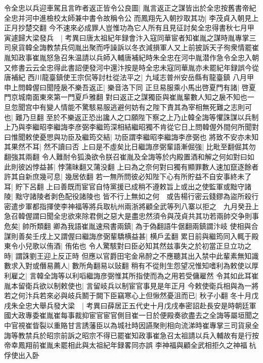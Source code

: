 令全忠以兵迎車駕且言昨者返正皆令公良圖|{
	胤言返正之謀皆出於全忠按舊書帝紀全忠并河中進檢校太師兼中書令故稱令公}
而鳳翔先入朝抄取其功|{
	李茂貞入朝見上正月抄楚交翻}
今不速來必成罪人豈惟功為它人所有且見征討矣全忠得書秋七月甲寅遽歸大梁發兵　|{
	考異曰唐太祖紀年録會汴入寇同華宦者知崔胤之謀時胤專掌三司泉貨韓全誨教禁兵伺胤出聚而呼譟訴以冬衣減損軍人又上前披訴天子徇衆情罷崔胤知政事崔胤怒急召朱温請以兵師入輔唐補紀時朱全忠在河中胤潜作急令全忠入朝又修書云云全忠得此書詔便發河中還汴按是時全忠未寇同華胤亦未罷紀年録誤今從唐補紀}
西川龍臺鎮使王宗侃等討杜從法平之|{
	九域志普州安岳縣有龍臺鎮}
八月甲申上問韓偓曰聞陸扆不樂吾返正|{
	樂音洛下同}
正旦易服乘小馬出啓夏門有諸|{
	啓夏門京城南面東來第一門夏戶雅翻}
對曰返正之謀獨臣與崔胤輩數人知之扆不知也一旦忽聞宫中有變人情能不驚駭易服逃避何妨有之陛下責其為宰相無死難之志則可也|{
	難乃旦翻}
至於不樂返正恐出讒人之口願陛下察之上乃止韓全誨等懼誅謀以兵制上乃與李繼昭李繼誨李彦弼李繼筠深相結繼昭獨不肯從它日上問韓偓外間何所聞對曰惟聞敕使憂愳與功臣及繼筠交結|{
	功臣謂李繼昭李繼誨李彦弼也}
將致不安亦未知其果然不耳|{
	然不讀曰否}
上曰是不虛矣比日繼誨彦弼輩語漸倔強|{
	比毗至翻倔其勿翻強其兩翻}
令人難耐令狐渙欲令朕召崔胤及全誨等於内殿置酒和解之何如對曰如此則彼凶悖益甚|{
	悖蒲昧翻又蒲没翻}
上曰為之奈何對曰獨有顯罪數人速加竄逐餘者許其自新庶幾可息|{
	幾居依翻}
若一無所問彼必知陛下心有所貯益不自安事終未了耳|{
	貯下呂翻}
上曰善既而宦官自恃黨援已成稍不遵敕旨上或出之使監軍或黜守諸陵|{
	黜守諸陵者剥色配役諸陵也}
皆不行上無如之何　或告楊行密云錢鏐為盜所殺行密遣步軍都指揮使李神福等將兵取杭州兩浙將顧全武等列八寨以拒之　九月癸丑上急召韓偓謂曰聞全忠欲來除君側之惡大是盡忠然須令與茂貞共其功若兩帥交争則事危矣|{
	帥所類翻}
卿為我語崔胤速飛書兩鎮|{
	為于偽翻語牛倨翻兩鎮謂汴岐}
使相與合謀則善矣壬戌上又謂偓曰繼誨彦弼輩驕横益甚|{
	横戶孟翻}
累日前與繼筠同入輒于殿東令小兒歌以侑酒|{
	侑佑也}
令人驚駭對曰臣必知其然兹事失之於初當正旦立功之時|{
	謂誅劉王迎上反正時}
但應以官爵田宅金帛酧之不應聽其出入禁中此輩素無知識數求入對或僭易薦人|{
	數所角翻易以䜴翻}
稍有不從則生怨望况惟知嗜利為敕使以厚利雇之|{
	言韓全誨等以利㗖繼誨彦弼惟其所指使而為之用若受傭雇然}
令其如此耳崔胤本留衛兵欲以制敕使也|{
	言留岐兵以制宦官事見是年正月}
今敕使衛兵相與為一將若之何汴兵若來必與岐兵鬭于闕下臣竊寒心上但愀然憂沮而已|{
	秋子小翻}
冬十月戊戌朱全忠大舉兵發大梁　|{
	考異曰薛居正五代史十月戊戌奉密詔赴長安是時朝廷軍國大政專委崔胤崔每事裁抑宦官宦官側目崔一日於便殿奏欲盡去之全誨等屬垣聞之中官視崔眥裂以重賂甘言誘藩臣以為城社時因讌聚則相向流涕時崔專掌三司貨泉全誨等教禁兵於昭宗前訴之昭宗不得已罷崔知政事崔急召太祖請以兵入輔故有是行按帝幸鳳翔前崔胤未罷相此與太祖紀年録畧同亦誤}
李神福與顧全武相拒久之神福杭俘使出入卧

